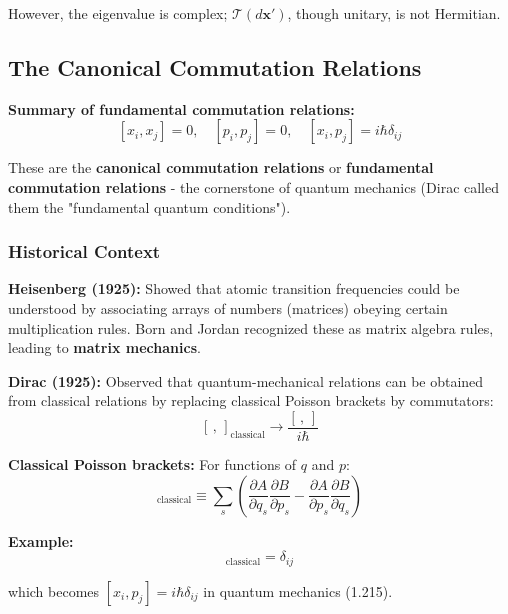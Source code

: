 \documentclass[11pt,a4paper]{article}
\begin{document}
However, the eigenvalue is complex; $\mathcal{T}(d\mathbf{x}')$, though unitary, is not Hermitian.

\subsection{The Canonical Commutation Relations}

\textbf{Summary of fundamental commutation relations:}
\begin{equation}
\boxed{[x_i, x_j] = 0, \quad [p_i, p_j] = 0, \quad [x_i, p_j] = i\hbar\delta_{ij}}
\tag{1.228}
\end{equation}

These are the \textbf{canonical commutation relations} or \textbf{fundamental commutation relations} - the cornerstone of quantum mechanics (Dirac called them the "fundamental quantum conditions").

\subsubsection{Historical Context}

\textbf{Heisenberg (1925):} Showed that atomic transition frequencies could be understood by associating arrays of numbers (matrices) obeying certain multiplication rules. Born and Jordan recognized these as matrix algebra rules, leading to \textbf{matrix mechanics}.

\textbf{Dirac (1925):} Observed that quantum-mechanical relations can be obtained from classical relations by replacing classical Poisson brackets by commutators:
\begin{equation}
\boxed{[\, , \,]_{\text{classical}} \to \frac{[\, , \,]}{i\hbar}}
\tag{1.229}
\end{equation}

\textbf{Classical Poisson brackets:} For functions of $q$ and $p$:
\begin{equation}
[A(q,p), B(q,p)]_{\text{classical}} \equiv \sum_s \left(\frac{\partial A}{\partial q_s}\frac{\partial B}{\partial p_s} - \frac{\partial A}{\partial p_s}\frac{\partial B}{\partial q_s}\right)
\tag{1.230}
\end{equation}

\textbf{Example:}
\begin{equation}
[x_i, p_j]_{\text{classical}} = \delta_{ij}
\tag{1.231}
\end{equation}

which becomes $[x_i, p_j] = i\hbar\delta_{ij}$ in quantum mechanics (1.215).
\end{document}
